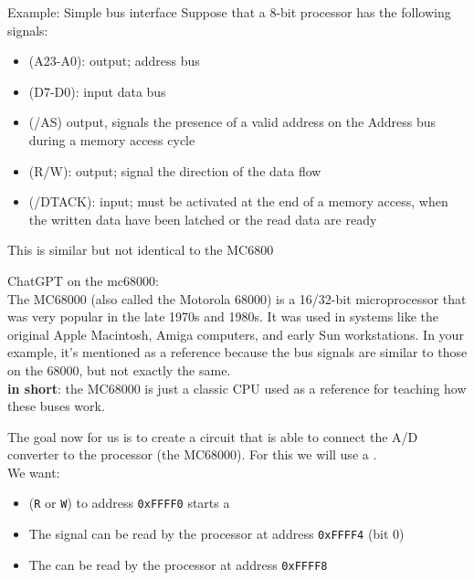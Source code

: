 \begin{parag}{Example: Simple bus interface}
    Suppose that a 8-bit processor has the following signals:
	\begin{itemize}
	    \item {} (A23-A0): output; address bus
		\item {} (D7-D0): input data bus 
		\item {} (/AS) output, signals the presence of a valid address on the Address bus during a memory access cycle
		\item {} (R/W): output; signal the direction of the data flow
		\item {} (/DTACK): input; must be activated at the end of a memory access, when the written data have been latched or the read data are ready
	\end{itemize}
	This is similar but not identical to the MC6800
	\begin{framedremark}
	ChatGPT on the mc68000:\\
	The MC68000 (also called the Motorola 68000) is a 16/32-bit microprocessor that was very popular in the late 1970s and 1980s. It was used in systems like the original Apple Macintosh, Amiga computers, and early Sun workstations. In your example, it’s mentioned as a reference because the bus signals are similar to those on the 68000, but not exactly the same.\\
	\textbf{in short}: the MC68000 is just a classic CPU used as a reference for teaching how these buses work.
	\end{framedremark}
	
\end{parag}
The goal now for us is to create a circuit that is able to connect the A/D converter to the processor (the MC68000). For this we will use a . \\
We want: 
\begin{itemize}
    \item {} (\texttt{R} or \texttt{W}) to address \texttt{0xFFFF0} starts a 
    \item The  signal can be read by the processor at address \texttt{0xFFFF4} (bit 0)
    \item The  can be read by the processor at address \texttt{0xFFFF8}
\end{itemize}
